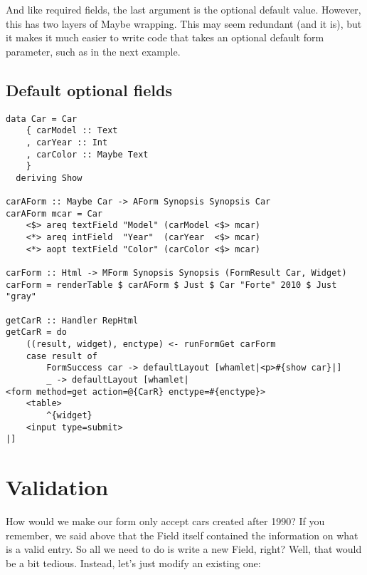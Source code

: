 And like required fields, the last argument is the optional default value. However, this
has two layers of Maybe wrapping. This may seem redundant (and it is), but it makes it
much easier to write code that takes an optional default form parameter, such as in the
next example.

\subsection{Default optional fields}

\begin{lstlisting}
data Car = Car
    { carModel :: Text
    , carYear :: Int
    , carColor :: Maybe Text
    }
  deriving Show

carAForm :: Maybe Car -> AForm Synopsis Synopsis Car
carAForm mcar = Car
    <$> areq textField "Model" (carModel <$> mcar)
    <*> areq intField  "Year"  (carYear  <$> mcar)
    <*> aopt textField "Color" (carColor <$> mcar)

carForm :: Html -> MForm Synopsis Synopsis (FormResult Car, Widget)
carForm = renderTable $ carAForm $ Just $ Car "Forte" 2010 $ Just "gray"

getCarR :: Handler RepHtml
getCarR = do
    ((result, widget), enctype) <- runFormGet carForm
    case result of
        FormSuccess car -> defaultLayout [whamlet|<p>#{show car}|]
        _ -> defaultLayout [whamlet|
<form method=get action=@{CarR} enctype=#{enctype}>
    <table>
        ^{widget}
    <input type=submit>
|]
\end{lstlisting}

\section{Validation}

How would we make our form only accept cars created after 1990? If you remember, we said
above that the Field itself contained the information on what is a valid entry. So all we
need to do is write a new Field, right? Well, that would be a bit tedious. Instead, let's
just modify an existing one:

